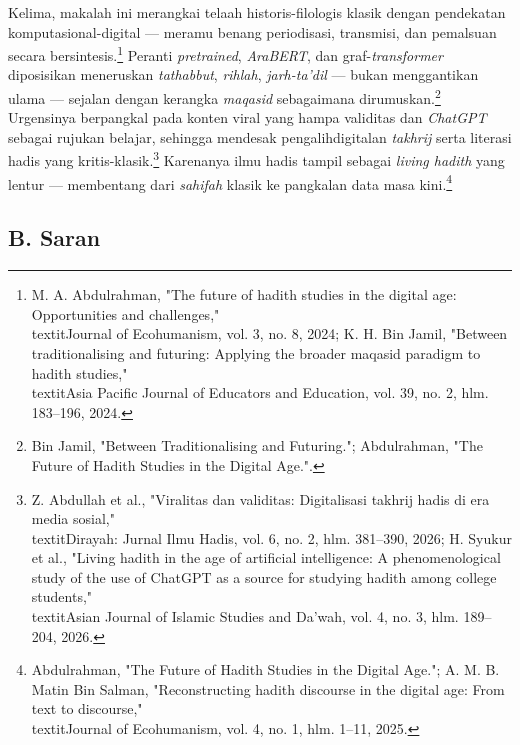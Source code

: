 Kelima, makalah ini merangkai telaah historis-filologis klasik dengan pendekatan komputasional-digital --- meramu benang periodisasi, transmisi, dan pemalsuan secara bersintesis.\footnote{M. A. Abdulrahman, "The future of hadith studies in the digital age: Opportunities and challenges," \\textit{Journal of Ecohumanism}, vol. 3, no. 8, 2024; K. H. Bin Jamil, "Between traditionalising and futuring: Applying the broader maqasid paradigm to hadith studies," \\textit{Asia Pacific Journal of Educators and Education}, vol. 39, no. 2, hlm. 183--196, 2024.} Peranti \textit{pretrained}, \textit{AraBERT}, dan graf-\textit{transformer} diposisikan meneruskan \textit{tathabbut}, \textit{rihlah}, \textit{jarh-ta'dil} --- bukan menggantikan ulama --- sejalan dengan kerangka \textit{maqasid} sebagaimana dirumuskan.\footnote{Bin Jamil, "Between Traditionalising and Futuring."; Abdulrahman, "The Future of Hadith Studies in the Digital Age.".} Urgensinya berpangkal pada konten viral yang hampa validitas dan \textit{ChatGPT} sebagai rujukan belajar, sehingga mendesak pengalihdigitalan \textit{takhrij} serta literasi hadis yang kritis-klasik.\footnote{Z. Abdullah et al., "Viralitas dan validitas: Digitalisasi takhrij hadis di era media sosial," \\textit{Dirayah: Jurnal Ilmu Hadis}, vol. 6, no. 2, hlm. 381--390, 2026; H. Syukur et al., "Living hadith in the age of artificial intelligence: A phenomenological study of the use of ChatGPT as a source for studying hadith among college students," \\textit{Asian Journal of Islamic Studies and Da'wah}, vol. 4, no. 3, hlm. 189--204, 2026.} Karenanya ilmu hadis tampil sebagai \textit{living hadith} yang lentur --- membentang dari \textit{sahifah} klasik ke pangkalan data masa kini.\footnote{Abdulrahman, "The Future of Hadith Studies in the Digital Age."; A. M. B. Matin Bin Salman, "Reconstructing hadith discourse in the digital age: From text to discourse," \\textit{Journal of Ecohumanism}, vol. 4, no. 1, hlm. 1--11, 2025.}

\subsection*{B. Saran}

